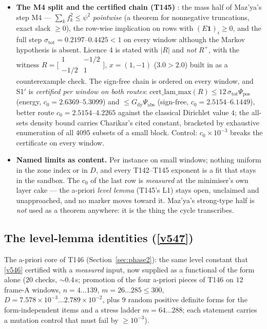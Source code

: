 \documentclass[11pt,a4paper]{article}
\begin{document}
\begin{itemize}[leftmargin=1.5em]
direction $\lambda_{\min}(E)/\kappa_{\mathrm{up}}\le\lambda_{\min}(A,A_B)$ holds on every window
--- a \emph{denominator} comparison, untouched by T142's numerator obstruction --- and the
Cholesky refuses at the shrunken shift $0.995\,\lambda_{\max}(W)$.
\item \textbf{The M4 split and the certified chain (T145)} \mE: the mass half of Maz'ya's step
M4 --- $\sum_kf_k^2\le\psi^2$ \emph{pointwise} (a theorem for nonnegative truncations, exact
slack $\ge0$), the row-wise implication on rows with $(E\mathbf 1)_i\ge0$, and the full step
$\sigma_{\mathrm{tot}}=0.2197$--$0.4425<1$ on every window although the Markov hypothesis is
absent. Licence 4 is stated with $|R|$ and \emph{not} $R^{+}$, with the witness
$R=\bigl[\begin{smallmatrix}1&-1/2\\-1/2&1\end{smallmatrix}\bigr]$, $x=(1,-1)$ ($3.0>2.0$) built
in as a counterexample check. The sign-free chain is ordered on every window, and S1$'$ is
\emph{certified per window on both routes}:
$\mathrm{cert\_lam\_max}(R)\le12\,\sigma_{\mathrm{tot}}\Psi_{\mathrm{pos}}$ (energy,
$c_0=2.6369$--$5.3099$) and $\le G_{\mathrm{dy}}\Psi_{\mathrm{abs}}$ (sign-free,
$c_0=2.5154$--$6.1449$), better route $c_0=2.5154$--$4.2265$ against the classical Dirichlet
value $4$; the all-sets density bound carries Charikar's cited constant, bracketed by exhaustive
enumeration of all $4095$ subsets of a small block. Control: $c_0\times10^{-3}$ breaks the
certificate on every window.
\item \textbf{Named limits as content.} Per instance on small windows; nothing uniform in the
zone index or in $D$, and every T142--T145 exponent is a fit that stays in the sandbox. The
$c_0$ of the last row is \emph{measured} at the minimiser's own layer cake --- the a-priori
\emph{level lemma} (T145's L1) stays open, unclaimed and unapproached, and no marker moves
toward it. Maz'ya's strong-type half is \emph{not} used as a theorem anywhere: it is the thing
the cycle transcribes.
\end{itemize}

\subsection{The level-lemma identities (\texorpdfstring{\vref{v547}}{v547})}\label{sec:v547}
The a-priori core of T146 (Section~\ref{sec:phase2}): the same level constant that \vref{v546}
certified with a \emph{measured} input, now supplied as a functional of the form alone
 ($20$ checks, ${\sim}0.4$\,s; promotion of the four
a-priori pieces of T146 on $12$ frame-A windows, $n=4\ldots139$, $m=26\ldots285\le300$,
$D=7.578\times10^{-3}\ldots2.789\times10^{-2}$, plus $9$ random positive definite forms for the
form-independent items and a stress ladder $m=64\ldots288$; each statement carries a mutation
control that must fail by $\ge10^{-3}$).
\end{document}
